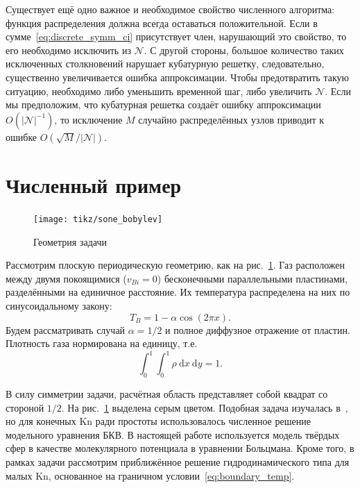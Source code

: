 \documentclass[10pt]{article}
\newcommand{\Kn}{\mathrm{Kn}}
\newcommand{\dd}{\:\mathrm{d}}
\newcommand{\OO}[1]{O(#1)}
\begin{document}
Существует ещё одно важное и необходимое свойство численного алгоритма:
функция распределения должна всегда оставаться положительной.
Если в сумме~\eqref{eq:discrete_symm_ci} присутствует член, нарушающий это свойство,
то его необходимо исключить из \(\mathcal{N}\).
С другой стороны, большое количество таких исключенных столкновений
нарушает кубатурную решетку, следовательно, существенно увеличивается ошибка аппроксимации.
Чтобы предотвратить такую ситуацию, необходимо либо уменьшить временной шаг, либо увеличить \(\mathcal{N}\).
Если мы предположим, что кубатурная решетка создаёт ошибку аппроксимации \(\OO{|\mathcal{N}|^{-1}}\),
то исключение \(M\) случайно распределённых узлов приводит к ошибке \(\OO{\sqrt{M}/|\mathcal{N}|}\).

\section{Численный пример}

\begin{figure}
    \vspace{-10pt}
    \centering
    \texttt{[image: tikz/sone\_bobylev]}
    \vspace{-5pt}
    \caption{Геометрия задачи}\label{fig:geometry}
\end{figure}

Рассмотрим плоскую периодическую геометрию, как на рис.~\ref{fig:geometry}.
Газ расположен между двумя покоящимися (\(v_{Bi} = 0\)) бесконечными параллельными пластинами,
разделёнными на единичное расстояние. Их температура распределена на них по синусоидальному закону:
\begin{equation}
    T_B = 1-\alpha\cos(2\pi x).
\end{equation}
Будем рассматривать случай \(\alpha=1/2\) и полное диффузное отражение от пластин.
Плотность газа нормирована на единицу, т.е.
\begin{equation}\label{eq:total_mass}
    \int_0^1\int_0^1\rho\dd{x}\dd{y} = 1.
\end{equation}

В силу симметрии задачи, расчётная область представляет собой квадрат со стороной \(1/2\).
На рис.~\ref{fig:geometry} выделена серым цветом.
Подобная задача изучалась в~\cite{Sone1996}, но для конечных \(\Kn\) ради простоты
использовалось численное решение модельного уравнения БКВ.
В настоящей работе используется модель твёрдых сфер в качестве молекулярного потенциала
в уравнении Больцмана.
Кроме того, в рамках задачи рассмотрим приближённое решение гидродинамического типа для малых \(\Kn\),
основанное на граничном условии~\eqref{eq:boundary_temp}.
\end{document}

